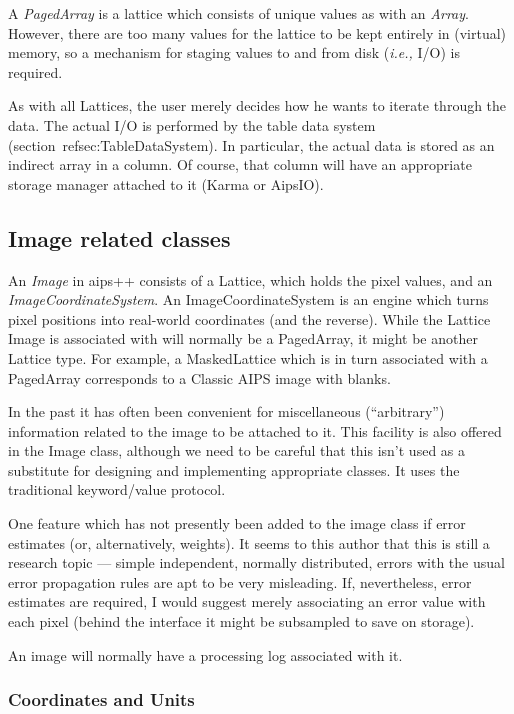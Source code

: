 A {\em PagedArray} is a lattice which consists of unique values as
with an {\em Array}. However, there are too many values for the
lattice to be kept entirely in (virtual) memory, so a mechanism for
staging values to and from disk ({\em i.e.,} I/O) is required.

As with all Lattices, the user merely decides how he wants to iterate
through the data. The actual I/O is performed by the table data system
(section~ref{sec:TableDataSystem}). In particular, the actual data is
stored as an indirect array in a column. Of course, that column will
have an appropriate storage manager attached to it (Karma or AipsIO).

\subsection{Image related classes}

An {\em Image} in {\sc aips++} consists of a Lattice, which holds the
pixel values, and an {\em ImageCoordinateSystem}. An
ImageCoordinateSystem is an engine which turns pixel positions into
real-world coordinates (and the reverse).  While the Lattice Image is
associated with will normally be a PagedArray, it might be another
Lattice type. For example, a MaskedLattice which is in turn associated
with a PagedArray corresponds to a Classic AIPS image with blanks.

In the past it has often been convenient for miscellaneous
(``arbitrary'') information related to the image to be attached to
it. This facility is also offered in the Image class, although we need
to be careful that this isn't used as a substitute for designing and
implementing appropriate classes. It uses the traditional
keyword/value protocol.

One feature which has not presently been added to the image class if
error estimates (or, alternatively, weights). It seems to this author
that this is still a research topic --- simple independent, normally
distributed, errors with the usual error propagation rules are apt to
be very misleading. If, nevertheless, error estimates are required, I
would suggest merely associating an error value with each pixel
(behind the interface it might be subsampled to save on storage).

An image will normally have a processing log associated with it.

\subsubsection{Coordinates and Units}

